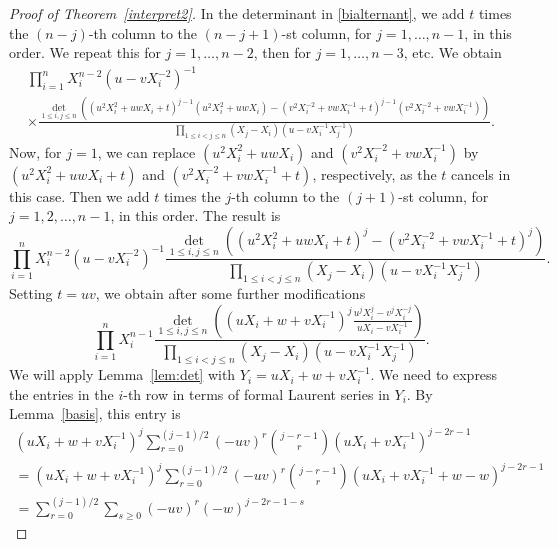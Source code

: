 \documentclass[12pt]{amsart}
\theoremstyle{definition}
\numberwithin{equation}{section}
\begin{document}
\begin{proof}[Proof of Theorem~\ref{interpret2}]
	In the determinant in \eqref{bialternant}, we add $t$ times the $(n-j)$-th column to the $(n-j+1)$-st column, for $j=1,\ldots,n-1$, in this order. We repeat this for $j=1,\ldots,n-2$, then for 
	$j=1,\ldots,n-3$, etc. We obtain 
	\begin{multline*} 
		\prod_{i=1}^{n} X_i^{n-2} (u-v X_i^{-2})^{-1}\\
		\times
		\frac{\det\limits_{1 \le i,j \le n} \left( \left(u^2 X_i^2 + u w X_i+t \right)^{j-1} \left(u^2 X_i^2 + u w X_i \right) - \left(v^2 X_i^{-2} + v w X_i^{-1}+t\right)^{j-1} \left(v^2 X_i^{-2} + v w X_i^{-1}\right) \right)}{\prod\limits_{1 \le i < j \le n} (X_j - X_i)\left( u - v X_i^{-1} X_j^{-1}  \right)}.
	\end{multline*}
	Now, for $j=1$, we can replace $\left(u^2 X_i^2 + u w X_i \right)$ and $\left(v^2 X_i^{-2} + v w X_i^{-1}\right)$ by $\left(u^2 X_i^2 + u w X_i+t \right)$ and $\left(v^2 X_i^{-2} + v w X_i^{-1}+t\right)$, respectively, as the $t$ cancels in this case. Then we add $t$ times the $j$-th column to the 
	$(j+1)$-st column, for $j=1,2,\ldots,n-1$, in this order. The result is
	\begin{equation*}
	\prod_{i=1}^{n} X_i^{n-2} (u-v X_i^{-2})^{-1}  
	\frac{\det_{1 \le i,j \le n} \left( \left(u^2 X_i^2 + u w X_i+t \right)^{j}  - \left(v^2 X_i^{-2} + v w X_i^{-1}+t\right)^{j} \right)}{\prod_{1 \le i < j \le n} (X_j - X_i)\left( u - v X_i^{-1} X_j^{-1}  \right)}.
	\end{equation*}
	Setting $t=u v$, we obtain after some further modifications 
	\begin{equation*}
	\prod_{i=1}^{n} X_i^{n-1} 
	\frac{\det_{1 \le i,j \le n} \left( (u X_i + w + v X_i^{-1})^{j} 
		\frac{u^j X_i^j- v^j X_i^{-j}}{u X_i - v X_i^{-1}} \right)}{\prod_{1 \le i < j \le n} (X_j - X_i)\left( u - v X_i^{-1} X_j^{-1}  \right)}.
	\end{equation*}
	We will apply Lemma~\ref{lem:det} with $Y_i=u X_i +w + v X_i^{-1}$. We need to express the entries in the $i$-th row in terms of formal Laurent series in $Y_i$. By Lemma~\ref{basis}, this entry is 
	\begin{multline*} 
		(u X_i + w + v X_i^{-1})^{j} \sum_{r=0}^{(j-1)/2} (-uv)^r \binom{j-r-1}{r} (u X_i + v X_i^{-1})^{j-2r-1} \\
		=(u X_i + w + v X_i^{-1})^{j} \sum_{r=0}^{(j-1)/2} (-uv)^r \binom{j-r-1}{r} (u X_i + v X_i^{-1}+w-w)^{j-2r-1} 
		\\
		=\sum_{r=0}^{(j-1)/2} \sum_{s \ge 0} (-uv)^r (-w)^{j-2r-1-s} 

\end{multline*}
\end{proof}
\end{document}
